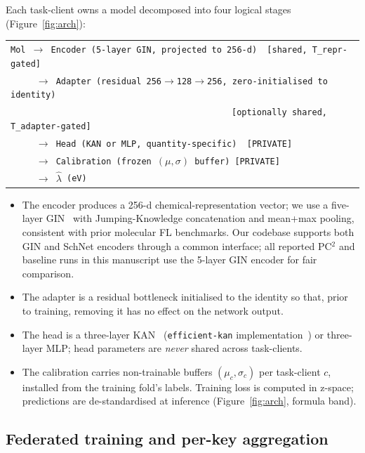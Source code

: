 \documentclass[11pt,a4paper]{article}
\newcommand{\hatlambda}{\hat{\lambda}}
\begin{document}
Each task-client owns a model decomposed into four logical stages (Figure~\ref{fig:arch}):
\begin{center}
\small
\begin{tabular}{l}
\texttt{Mol $\to$ Encoder (5-layer GIN, projected to 256-d)~~[shared, T\_repr-gated]} \\
\texttt{~~~~~$\to$ Adapter (residual 256$\to$128$\to$256, zero-initialised to identity)} \\
\texttt{~~~~~~~~~~~~~~~~~~~~~~~~~~~~~~~~~~~~~~~~~~~~[optionally shared, T\_adapter-gated]} \\
\texttt{~~~~~$\to$ Head (KAN or MLP, quantity-specific)~~[PRIVATE]} \\
\texttt{~~~~~$\to$ Calibration (frozen $(\mu, \sigma)$ buffer)~[PRIVATE]} \\
\texttt{~~~~~$\to$ $\hatlambda$ (eV)}
\end{tabular}
\end{center}

\begin{itemize}
  \item The encoder produces a 256-d chemical-representation vector; we use a five-layer GIN~\citep{Xu2019_GIN} with Jumping-Knowledge concatenation and mean+max pooling, consistent with prior molecular FL benchmarks. Our codebase supports both GIN and SchNet encoders through a common interface; all reported PC$^2$ and baseline runs in this manuscript use the 5-layer GIN encoder for fair comparison.
  \item The adapter is a residual bottleneck initialised to the identity so that, prior to training, removing it has no effect on the network output.
  \item The head is a three-layer KAN~\citep{KAN2024} (\texttt{efficient-kan} implementation~\citep{EfficientKAN2024}) or three-layer MLP; head parameters are \emph{never} shared across task-clients.
  \item The calibration carries non-trainable buffers $(\mu_c, \sigma_c)$ per task-client $c$, installed from the training fold's labels. Training loss is computed in z-space; predictions are de-standardised at inference (Figure~\ref{fig:arch}, formula band).
\end{itemize}

\subsection{Federated training and per-key aggregation}\label{sec:fed}
\end{document}
